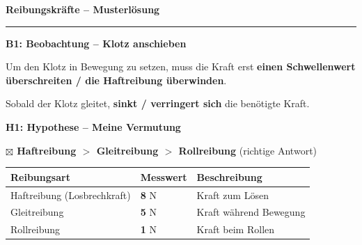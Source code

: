 \documentclass[11pt,a4paper]{article}
\newcommand{\aufgabe}[1]{\noindent\textbf{\textcolor{fachfarbe}{#1}}}
\newcommand{\lsg}[1]{\textcolor{loesung}{\textbf{#1}}}
\begin{document}
{\Large\bfseries Reibungskräfte -- \textcolor{loesung}{Musterlösung}}\\[0.2em]
\hrule
\vspace{0.5em}

\aufgabe{B1: Beobachtung -- Klotz anschieben}

\vspace{0.2em}
Um den Klotz in Bewegung zu setzen, muss die Kraft erst \lsg{einen Schwellenwert überschreiten / die Haftreibung überwinden}.

Sobald der Klotz gleitet, \lsg{sinkt / verringert sich} die benötigte Kraft.

\vspace{0.2em}

\aufgabe{H1: Hypothese -- Meine Vermutung}

\vspace{0.2em}
\lsg{$\boxtimes$ Haftreibung $>$ Gleitreibung $>$ Rollreibung} {\small (richtige Antwort)}

\vspace{0.3em}

\begin{protokollbox}[title=T1: Messwerte -- Drei Reibungsarten]
\small
\renewcommand{\arraystretch}{1.3}
\begin{tabular}{|p{4cm}|p{3cm}|p{5cm}|}
\hline
\textbf{Reibungsart} & \textbf{Messwert} & \textbf{Beschreibung} \\
\hline
Haftreibung (Losbrechkraft) & \lsg{8} N & Kraft zum Lösen \\
\hline
Gleitreibung & \lsg{5} N & Kraft während Bewegung \\
\hline
Rollreibung & \lsg{1} N & Kraft beim Rollen \\
\hline
\end{tabular}
\end{protokollbox}
\end{document}
